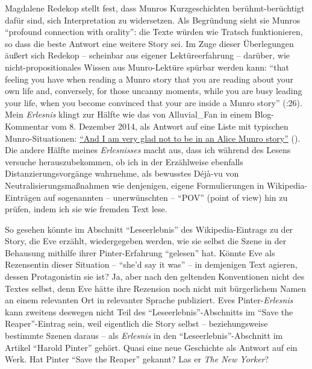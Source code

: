 \documentclass[fontsize=12pt]{scrartcl}
\begin{document}
Magdalene Redekop stellt fest, dass Munros Kurzgeschichten ber\"uhmt-ber\"uchtigt daf\"ur sind, sich Interpretation zu widersetzen. Als Begr\"undung sieht sie Munros "`profound connection with orality"': die Texte w\"urden wie Tratsch funktionieren, so dass die beste Antwort eine weitere Story sei. Im Zuge dieser \"Uberlegungen \"au{\ss}ert sich Redekop -- scheinbar aus eigener Lekt\"ureerfah\-rung -- dar\"uber, wie nicht-pro\-po\-si\-ti\-o\-na\-les Wissen aus Munro-Lekt\"ure sp\"urbar werden kann: "`that feeling you have when reading a Munro story that you are reading about your own life and, conversely, for those uncanny moments, while you are busy leading your life, when you become convinced that your are inside a Munro story"' (\cite{Redekop1999}:26). Mein \textit{Erlesnis} klingt zur H\"alfte wie das von Alluvial\_Fan in einem Blog-Kommentar vom 8. Dezember 2014, als Antwort auf eine Liste mit ty\-pischen Munro-Situationen: \href{http://the-toast.net/2014/12/08/tell-alice-munro-story/\#IDComment926099751}{"`And I am very glad not to be in an Alice Munro story"'} (\cite{AlluvialFan2014}). Die andere H\"alfte meines \textit{Erlesnisses} macht aus, dass ich w\"ahrend des Lesens versuche he\-rauszubekommen, ob ich in der Erz\"ahlweise ebenfalls Distanzierungsvorg\"ange wahrnehme, als bewusstes D\'{e}j\`{a}-vu von Neu\-tra\-li\-sie\-rungs\-ma{\ss}\-nahmen wie denjenigen, eigene Formulierungen in Wi\-ki\-pe\-dia-Eintr\"agen auf sogenannten -- unerw\"unschten -- "`POV"' (point of view) hin zu pr\"ufen, indem ich sie wie fremden Text lese.

So gesehen k\"onnte im Abschnitt "`Leseerlebnis"' des Wi\-ki\-pe\-dia-Eintrags zu der Story, die Eve erz\"ahlt, wiedergegeben werden, wie sie \mbox{selbst} die Szene in der Behausung mithilfe ihrer Pinter-Erfah\-rung "`gelesen"' hat. K\"onnte Eve als Rezensentin dieser Situation -- "`she'd say it was"' -- in demjenigen Text agieren, dessen Protagonistin\textsuperscript{\tiny *} sie ist? Ja, aber nach den geltenden Konventionen nicht des Textes \mbox{selbst}, denn Eve h\"atte ihre Rezension noch nicht mit b\"urgerlichem Namen an einem relevanten Ort in relevanter Sprache pu\-bli\-ziert. Eves Pinter-\textit{Erlesnis} kann zwei\-tens deswegen nicht Teil des "`Leseerlebnis"'-Abschnitts im "`Save the Reaper"'-Eintrag sein, weil eigentlich die Story \mbox{selbst} -- beziehungsweise bestimmte Szenen daraus -- als \textit{Erlesnis} in den "`Leseerlebnis"'-Abschnitt im Artikel "`Harold Pinter"' geh\"ort. Quasi eine neue Geschichte als Antwort auf ein Werk. Hat Pinter "`Save the Reaper"' gekannt? Las er \textit{The New Yorker}?
\end{document}
